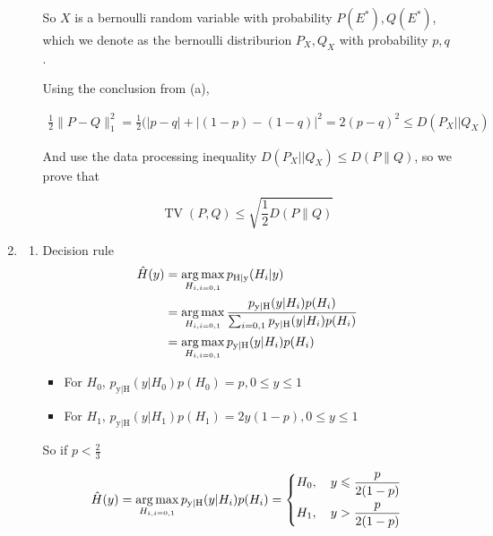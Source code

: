 \documentclass[a4paper]{article}
\begin{document}
\begin{enumerate}
\begin{enumerate}
  So $X$ is a bernoulli random variable with probability $P(E^*),Q(E^*)$, which we denote as the bernoulli distriburion $P_X,Q_X$ with probability $p,q$.

  Using the conclusion from (a), 

  \begin{equation}
    \begin{aligned}
      \frac 1 2 \|P-Q \|^2_1 = \frac{1}{2} (|p-q|+|(1-p)-(1-q)|^2 = 2(p-q)^2 \leqslant  D(P_X||Q_X)
    \end{aligned}
  \end{equation}
  

  And use the data processing inequality $D(P_X||Q_X) \leqslant D(P\| Q)$, so we prove that 

  \begin{equation}
    \operatorname{TV}(P, Q) \leqslant \sqrt{\frac{1}{2} D(P \| Q)} 
  \end{equation}

\end{enumerate}

\item \begin{enumerate} %
  \item Decision rule
  \begin{equation}
    \begin{aligned}
      \hat H(y) & = \operatorname*{arg\,max}_{H_{i,i=0,1}} p_{\mathrm{H}| \mathrm{y}}(H_i|y) \\
      & = \operatorname*{arg\,max}_{H_{i,i=0,1}} \frac {p_{\mathrm{y} | \mathrm{H}}(y| H_i)p(H_i)}{\sum_{i=0,1} p_{\mathrm{y} | \mathrm{H}}(y| H_i)p(H_i)} \\ 
      & = \operatorname*{arg\,max}_{H_{i,i=0,1}} p_{\mathrm{y} | \mathrm{H}}(y| H_i)p(H_i)
    \end{aligned}
  \end{equation}

  \begin{itemize}
    \item For $H_0$, $p_{\mathrm{y} | \mathrm{H}}(y| H_0)p(H_0) = p,0\leqslant y \leqslant 1$
    \item For $H_1$, $p_{\mathrm{y} | \mathrm{H}}(y| H_1)p(H_1) = 2y(1-p),0\leqslant y \leqslant 1$
  \end{itemize}

  So  if $p <\frac {2}{3}$

  \begin{equation}
    \hat H(y) = \operatorname*{arg\,max}_{H_{i,i=0,1}} p_{\mathrm{y} | \mathrm{H}}(y| H_i)p(H_i) = \left\{ \begin{aligned}
      H_0, \quad y \leqslant \frac{p}{2(1-p)} \\
      H_1, \quad y >  \frac{p}{2(1-p)}
    \end{aligned}\right.
  \end{equation}


\end{enumerate}
\end{enumerate}
\end{document}
